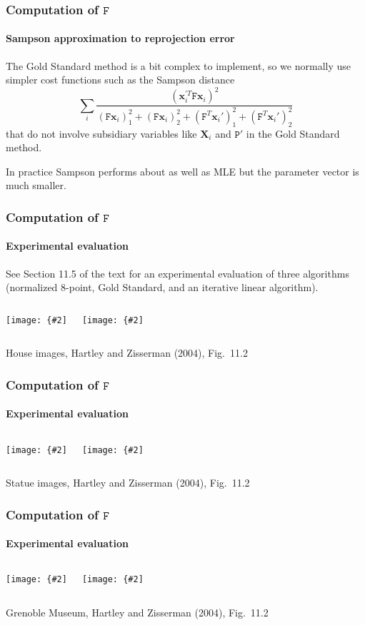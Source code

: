\documentclass[aspectratio=169]{beamer}
\renewcommand{\vec}[1]{\boldsymbol{#1}}
\newcommand{\mat}[1]{\mathtt{#1}}
\newcommand{\myfig}[3]{\centerline{\texttt{[image: \{\#2]}}}
    \centerline{\scriptsize #3}}
\begin{document}
\begin{frame}
\frametitle{Computation of $\mat{F}$}
\framesubtitle{Sampson approximation to reprojection error}

The Gold Standard method is a bit complex to implement, so we normally
use simpler cost functions such as the \alert{Sampson distance}
\begin{equation*}
\sum_i \frac{(\vec{x}_i^{\prime T}\mat{F}\vec{x}_i)^2}
{(\mat{F}\vec{x}_i)^2_1+(\mat{F}\vec{x}_i)_2^2+(\mat{F}^T\vec{x}_i')_1^2
+ (\mat{F}^T\vec{x}_i')_2^2}
\end{equation*}
that do not involve subsidiary variables like $\vec{X}_i$ and
$\mat{P}'$ in the Gold Standard method.

\medskip

In practice Sampson performs about as well as MLE but the parameter
vector is much smaller.

\end{frame}

\begin{frame}
\frametitle{Computation of $\mat{F}$}
\framesubtitle{Experimental evaluation}

See Section 11.5 of the text for an experimental evaluation of three
algorithms (normalized 8-point, Gold Standard, and an iterative linear
algorithm).

\medskip

\begin{columns}
\column{2in}
\myfig{1.9in}{HZ-fig10-2a}{}
\column{2in}
\myfig{1.9in}{HZ-fig10-2b}{}
\end{columns}

\centerline{\scriptsize House images, Hartley and Zisserman (2004),
Fig.\ 11.2}

\end{frame}

\begin{frame}
\frametitle{Computation of $\mat{F}$}
\framesubtitle{Experimental evaluation}

\begin{columns}
\column{2in}
\myfig{1.9in}{HZ-fig10-2c}{}
\column{2in}
\myfig{1.9in}{HZ-fig10-2d}{}
\end{columns}

\centerline{\scriptsize Statue images, Hartley and Zisserman (2004),
Fig.\ 11.2}

\end{frame}

\begin{frame}
\frametitle{Computation of $\mat{F}$}
\framesubtitle{Experimental evaluation}

\begin{columns}
\column{2in}
\myfig{1.9in}{HZ-fig10-2e}{}
\column{2in}
\myfig{1.9in}{HZ-fig10-2f}{}
\end{columns}

\centerline{\scriptsize Grenoble Museum, Hartley and Zisserman (2004),
Fig.\ 11.2}

\end{frame}
\end{document}
